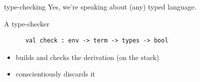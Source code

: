 \documentclass[ignorenonframetext,red]{beamer}
\begin{document}
\begin{frame}[fragile]{
    type-checking}
  Yes, we're speaking about (any) typed language.
  \begin{block}{A type-checker}
    \begin{lstlisting}
      val check : env -> term -> types -> bool
    \end{lstlisting}
    \begin{itemize}
    \item builds and checks the derivation (on the stack)
    \item conscientiously discards it
    \end{itemize}
  \end{block}
  
\end{frame}
\end{document}

